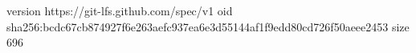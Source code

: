 version https://git-lfs.github.com/spec/v1
oid sha256:bcdc67cb874927f6e263aefc937ea6e3d55144af1f9edd80cd726f50aeee2453
size 696
